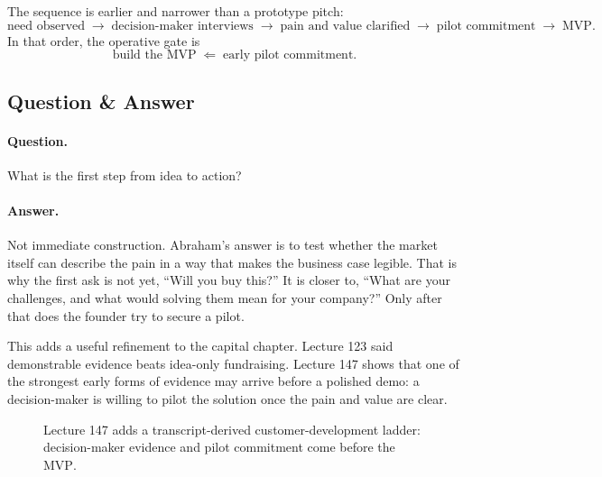 \documentclass[11pt,oneside]{book}
\begin{document}
The sequence is earlier and narrower than a prototype pitch:
\[
\text{need observed}
\;\longrightarrow\;
\text{decision-maker interviews}
\;\longrightarrow\;
\text{pain and value clarified}
\;\longrightarrow\;
\text{pilot commitment}
\;\longrightarrow\;
\mathrm{MVP}.
\]
In that order, the operative gate is
\[
\text{build the }\mathrm{MVP}
\;\Leftarrow\;
\text{early pilot commitment}.
\]

\subsection{Question \& Answer}

\paragraph{Question.}
What is the first step from idea to action?

\paragraph{Answer.}
Not immediate construction. Abraham's answer is to test whether the market itself can describe the pain in a way that makes the business case legible. That is why the first ask is not yet, ``Will you buy this?'' It is closer to, ``What are your challenges, and what would solving them mean for your company?'' Only after that does the founder try to secure a pilot.

This adds a useful refinement to the capital chapter. Lecture 123 said demonstrable evidence beats idea-only fundraising. Lecture 147 shows that one of the strongest early forms of evidence may arrive before a polished demo: a decision-maker is willing to pilot the solution once the pain and value are clear.

\begin{figure}
\centering
{}
\caption{Lecture 147 adds a transcript-derived customer-development ladder: decision-maker evidence and pilot commitment come before the \(\mathrm{MVP}\).}
\end{figure}
\end{document}
